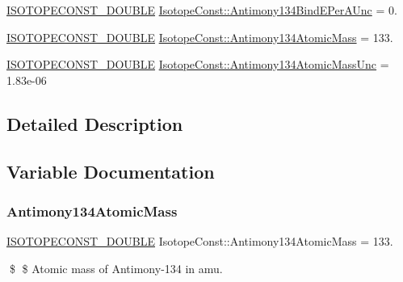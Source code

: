 \begin{DoxyCompactItemize}
\mbox{\hyperlink{group___isotope_const-_macros_ga8f45a7272ce02c0b4c65c44636ed719a}{I\+S\+O\+T\+O\+P\+E\+C\+O\+N\+S\+T\+\_\+\+D\+O\+U\+B\+LE}} \mbox{\hyperlink{group___isotope_const-_antimony-_sb134_ga63219a933487e389c5afda81932ea6a5}{Isotope\+Const\+::\+Antimony134\+Bind\+E\+Per\+A\+Unc}} = 0.
\item 
\mbox{\hyperlink{group___isotope_const-_macros_ga8f45a7272ce02c0b4c65c44636ed719a}{I\+S\+O\+T\+O\+P\+E\+C\+O\+N\+S\+T\+\_\+\+D\+O\+U\+B\+LE}} \mbox{\hyperlink{group___isotope_const-_antimony-_sb134_gaaab7ccbf2c0982166378cfd32726775b}{Isotope\+Const\+::\+Antimony134\+Atomic\+Mass}} = 133.
\item 
\mbox{\hyperlink{group___isotope_const-_macros_ga8f45a7272ce02c0b4c65c44636ed719a}{I\+S\+O\+T\+O\+P\+E\+C\+O\+N\+S\+T\+\_\+\+D\+O\+U\+B\+LE}} \mbox{\hyperlink{group___isotope_const-_antimony-_sb134_gaf6a272f369636c447efac7a87a77fc99}{Isotope\+Const\+::\+Antimony134\+Atomic\+Mass\+Unc}} = 1.\+83e-\/06
\end{DoxyCompactItemize}


\subsection{Detailed Description}


\subsection{Variable Documentation}
\mbox{\label{group___isotope_const-_antimony-_sb134_gaaab7ccbf2c0982166378cfd32726775b}} 
\subsubsection{\texorpdfstring{Antimony134\+Atomic\+Mass}{Antimony134AtomicMass}}
{\footnotesize\ttfamily \mbox{\hyperlink{group___isotope_const-_macros_ga8f45a7272ce02c0b4c65c44636ed719a}{I\+S\+O\+T\+O\+P\+E\+C\+O\+N\+S\+T\+\_\+\+D\+O\+U\+B\+LE}} Isotope\+Const\+::\+Antimony134\+Atomic\+Mass = 133.}

\$ \$ Atomic mass of Antimony-\/134 in amu. \mbox{\label{group___isotope_const-_antimony-_sb134_gaf6a272f369636c447efac7a87a77fc99}} 

